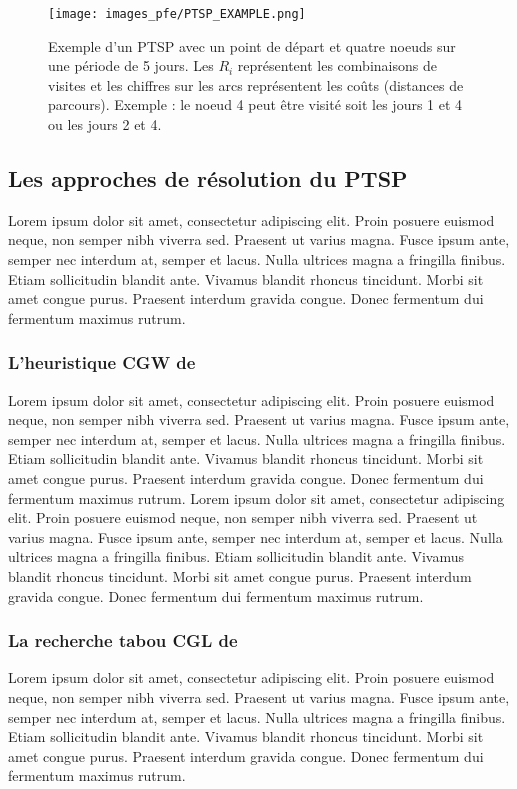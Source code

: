 \begin{figure}[hbt!]
  \centering
  \texttt{[image: images\_pfe/PTSP\_EXAMPLE.png]}
  \caption{Exemple d'un PTSP avec un point de départ et quatre noeuds sur une période de 5 jours. Les $R_i$ représentent les combinaisons de visites et les chiffres sur les arcs représentent les coûts (distances de parcours). Exemple : le noeud 4 peut être visité soit les jours 1 et 4 ou les jours 2 et 4. }
  \label{fig:ptsp-first-example}
\end{figure}
\FloatBarrier



\subsection{Les approches de résolution du PTSP}
Lorem ipsum dolor sit amet, consectetur adipiscing elit. Proin posuere euismod neque, non semper nibh viverra sed. Praesent ut varius magna. Fusce ipsum ante, semper nec interdum at, semper et lacus. Nulla ultrices magna a fringilla finibus. Etiam sollicitudin blandit ante. Vivamus blandit rhoncus tincidunt. Morbi sit amet congue purus. Praesent interdum gravida congue. Donec fermentum dui fermentum maximus rutrum.

\medskip

\subsubsection{L'heuristique CGW de \parencite{chao_new_1995}}
Lorem ipsum dolor sit amet, consectetur adipiscing elit. Proin posuere euismod neque, non semper nibh viverra sed. Praesent ut varius magna. Fusce ipsum ante, semper nec interdum at, semper et lacus. Nulla ultrices magna a fringilla finibus. Etiam sollicitudin blandit ante. Vivamus blandit rhoncus tincidunt. Morbi sit amet congue purus. Praesent interdum gravida congue. Donec fermentum dui fermentum maximus rutrum. Lorem ipsum dolor sit amet, consectetur adipiscing elit. Proin posuere euismod neque, non semper nibh viverra sed. Praesent ut varius magna. Fusce ipsum ante, semper nec interdum at, semper et lacus. Nulla ultrices magna a fringilla finibus. Etiam sollicitudin blandit ante. Vivamus blandit rhoncus tincidunt. Morbi sit amet congue purus. Praesent interdum gravida congue. Donec fermentum dui fermentum maximus rutrum.

\subsubsection{La recherche tabou CGL de \parencite{cordeau_tabu_1997} }
Lorem ipsum dolor sit amet, consectetur adipiscing elit. Proin posuere euismod neque, non semper nibh viverra sed. Praesent ut varius magna. Fusce ipsum ante, semper nec interdum at, semper et lacus. Nulla ultrices magna a fringilla finibus. Etiam sollicitudin blandit ante. Vivamus blandit rhoncus tincidunt. Morbi sit amet congue purus. Praesent interdum gravida congue. Donec fermentum dui fermentum maximus rutrum.

